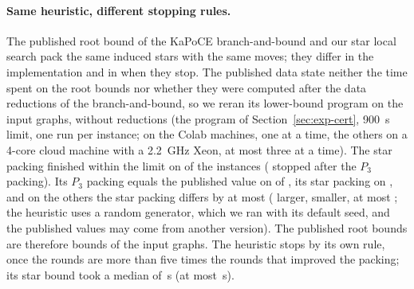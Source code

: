 \paragraph{Same heuristic, different stopping rules.}  The published root
bound of the KaPoCE branch-and-bound and our star local search pack the same
induced stars with the same moves; they differ in the implementation and in
when they stop.  The published data state neither the time spent on the root
bounds nor whether they were computed after the data reductions of the
branch-and-bound, so we reran its lower-bound program on the input graphs,
without reductions (the program of Section~\ref{sec:exp-cert}, \SI{900}{s}
limit, one run per instance; \numKrootPaceColab{} on the Colab machines, one
at a time, the others on a 4-core cloud machine with a \SI{2.2}{GHz} Xeon, at
most three at a time).  The star packing finished within the limit on
\numKrootPaceStarN{} of the \numKrootPaceN{} instances
(\numKrootPaceTimeoutList{} stopped after the $P_3$ packing).  Its $P_3$
packing equals the published value on \numKrootPacePthreeEqual{} of
\numKrootPacePthreeN{}, its star packing on \numKrootPaceStarEqual{}, and on
the others the star packing differs by at most \numKrootPaceStarDiffMax{}
(\numKrootPaceStarAbove{} larger, \numKrootPaceStarBelow{} smaller, at most
\numKrootPaceStarRelMax{}; the heuristic uses a random generator, which we
ran with its default seed, and the published values may come from another
version).  The published root bounds are therefore bounds of the input
graphs.  The heuristic stops by its own rule, once the rounds are more than
five times the rounds that improved the packing; its star bound took a median
of \numKrootPaceTimeMedian{}\,s (at most \numKrootPaceTimeMax{}\,s).

